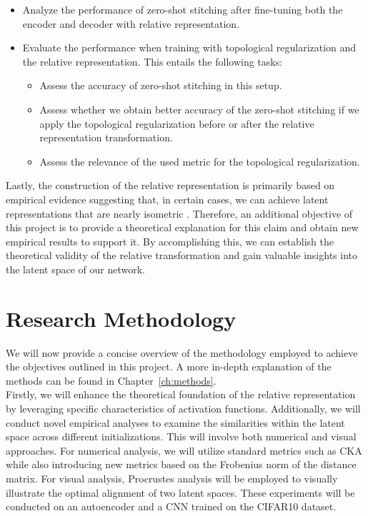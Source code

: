 \documentclass[../main.tex]{subfiles}
\begin{document}
\begin{itemize}
    \item Analyze the performance of zero-shot stitching after fine-tuning both the encoder and decoder with relative representation.
    
    \item Evaluate the performance when training with topological regularization and the relative representation. This entails the following tasks:

    \begin{itemize}        
        \item Assess the accuracy of zero-shot stitching in this setup.

        \item Assess whether we obtain better accuracy of the zero-shot stitching if we apply the topological regularization before or after the relative representation transformation.

        \item Assess the relevance of the used metric for the topological regularization.
    \end{itemize}
\end{itemize}

Lastly, the construction of the relative representation is primarily based on empirical evidence suggesting that, in certain cases, we can achieve latent representations that are nearly isometric \cite{moschella_relative_2022}. Therefore, an additional objective of this project is to provide a theoretical explanation for this claim and obtain new empirical results to support it. By accomplishing this, we can establish the theoretical validity of the relative transformation and gain valuable insights into the latent space of our network.


\section{Research Methodology}
We will now provide a concise overview of the methodology employed to achieve the objectives outlined in this project. A more in-depth explanation of the methods can be found in Chapter~\ref{ch:methods}.\\

Firstly,  we will enhance the theoretical foundation of the relative representation by leveraging specific characteristics of activation functions. Additionally, we will conduct novel empirical analyses to examine the similarities within the latent space across different initializations. This will involve both numerical and visual approaches. For numerical analysis, we will utilize standard metrics such as CKA while also introducing new metrics based on the Frobenius norm of the distance matrix. For visual analysis, Procrustes analysis will be employed to visually illustrate the optimal alignment of two latent spaces. These experiments will be conducted on an autoencoder and a CNN trained on the CIFAR10 dataset.\\
\end{document}
